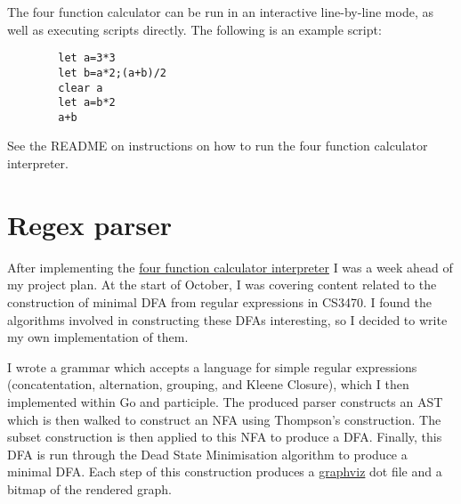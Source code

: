 The four function calculator can be run in an interactive line-by-line mode, as well as executing scripts directly. The following is an example script:

\begin{center}
    \begin{verbatim}
        let a=3*3
        let b=a*2;(a+b)/2
        clear a
        let a=b*2
        a+b
    \end{verbatim}
\end{center}

See the README on instructions on how to run the four function calculator interpreter.

\section{Regex parser}

After implementing the \hyperref[sec:four-func-calculator]{four function calculator interpreter} I was a week ahead of my project plan. At the start of October, I was covering content related to the construction of minimal DFA from regular expressions in CS3470. I found the algorithms involved in constructing these DFAs interesting, so I decided to write my own implementation of them.

I wrote a grammar which accepts a language for simple regular expressions (concatentation, alternation, grouping, and Kleene Closure), which I then implemented within Go and participle. The produced parser constructs an AST which is then walked to construct an NFA using Thompson's construction. The subset construction is then applied to this NFA to produce a DFA. Finally, this DFA is run through the Dead State Minimisation algorithm to produce a minimal DFA. Each step of this construction produces a \href{https://graphviz.org/}{graphviz} dot file and a bitmap of the rendered graph.

